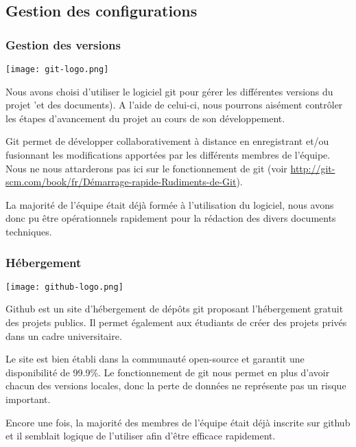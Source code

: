 \documentclass{../../res/univ-projet}
\begin{document}
\subsection{Gestion des configurations}
\subsubsection{Gestion des versions}
\texttt{[image: git-logo.png]}

Nous avons choisi d'utiliser le logiciel git pour gérer les différentes versions du projet 'et des documents). A l'aide de celui-ci, nous pourrons aisément contrôler les étapes d'avancement du projet au cours de son développement. 

Git permet de développer collaborativement à distance en enregistrant et/ou fusionnant les modifications apportées par les différents membres de l'équipe. Nous ne nous attarderons pas ici sur le fonctionnement de git (voir \href{http://git-scm.com/book/fr/Démarrage-rapide-Rudiments-de-Git}{http://git-scm.com/book/fr/Démarrage-rapide-Rudiments-de-Git}).

La majorité de l'équipe était déjà formée à l'utilisation du logiciel, nous avons donc pu être opérationnels rapidement pour la rédaction des divers documents techniques.

\subsubsection{Hébergement}
\texttt{[image: github-logo.png]}

Github est un site d'hébergement de dépôts git proposant l'hébergement gratuit des projets publics. Il permet également aux étudiants de créer des projets privés dans un cadre universitaire.

Le site est bien établi dans la communauté open-source et garantit une disponibilité de 99.9\%. Le fonctionnement de git nous permet en plus d'avoir chacun des versions locales, donc la perte de données ne représente pas un risque important.

Encore une fois, la majorité des membres de l'équipe était déjà inscrite sur github et il semblait logique de l'utiliser afin d'être efficace rapidement.

\newpage
\end{document}

